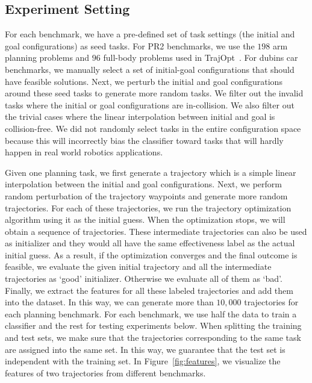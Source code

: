 \documentclass[letterpaper, 10 pt, conference]{ieeeconf}  %
\begin{document}
\subsection{Experiment Setting}
For each benchmark, we have a pre-defined set of task settings (the initial and goal configurations) as seed tasks. For PR2 benchmarks, we use the $198$ arm planning problems and $96$ full-body problems used in TrajOpt~\cite{Schulman:2013:FLO}. For dubins car benchmarks, we manually select a set of initial-goal configurations that should have feasible solutions. Next, we perturb the initial and goal configurations around these seed tasks to generate more random tasks. We filter out the invalid tasks where the initial or goal configurations are in-collision. We also filter out the trivial cases where the linear interpolation between initial and goal is collision-free. We did not randomly select tasks in the entire configuration space because this will incorrectly bias the classifier toward tasks that will hardly happen in real world robotics applications.

Given one planning task, we first generate a trajectory which is a simple linear interpolation between the initial and goal configurations. Next, we perform random perturbation of the trajectory waypoints and generate more random trajectories. For each of these trajectories, we run the trajectory optimization algorithm using it as the initial guess. When the optimization stops, we will obtain a sequence of trajectories. These intermediate trajectories can also be used as initializer and they would all have the same effectiveness label as the actual initial guess. As a result, if the optimization converges and the final outcome is feasible, we evaluate the given initial trajectory and all the intermediate trajectories as `good' initializer. Otherwise we evaluate all of them as `bad'. Finally, we extract the features for all these labeled trajectories and add them into the dataset. In this way, we can generate more than $10,000$ trajectories for each planning benchmark. For each benchmark, we use half the data to train a classifier and the rest for testing experiments below. When splitting the training and test sets, we make sure that the trajectories corresponding to the same task are assigned into the same set. In this way, we guarantee that the test set is independent with the training set.
In Figure~\ref{fig:features}, we visualize the features of two trajectories from different benchmarks.
\end{document}
